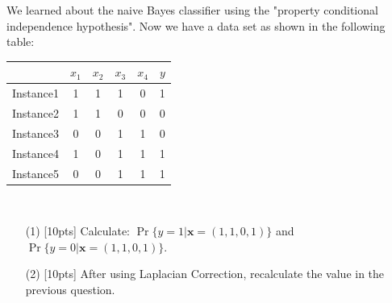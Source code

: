 \beginthishw
\begin{problem}
    We learned about the naive Bayes classifier using the "property conditional independence hypothesis". Now we have a data set as shown in the following table:

    \begin{tabular}{c|ccccc}
        \hline
        & $x_1$ & $x_2$ & $x_3$ & $x_4$ & $y$ \\
        \hline
        Instance1   & 1 & 1 & 1 & 0 & 1 \\
        \hline
        Instance2   & 1 & 1 & 0 & 0 & 0 \\
        \hline
        Instance3   & 0 & 0 & 1 & 1 & 0 \\
        \hline
        Instance4   & 1 & 0 & 1 & 1 & 1 \\
        \hline
        Instance5   & 0 & 0 & 1 & 1 & 1 \\
        \hline
    \end{tabular}
    \

    \begin{enumerate}
        \item[(1)][10pts]  Calculate: $\Pr\{ y=1 | \mathbf{x}=(1,1,0,1) \}$ and $\Pr\{ y=0 | \mathbf{x}=(1,1,0,1) \}$.
        \item[(2)][10pts] After using Laplacian Correction, recalculate the value in the previous question.
    \end{enumerate}
\end{problem}



